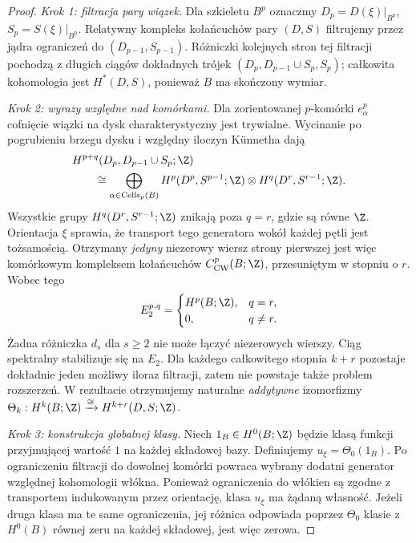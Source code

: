 \begin{proof}
\emph{Krok 1: filtracja pary wiązek.}
Dla szkieletu $B^p$ oznaczmy
$D_p=D(\xi)|_{B^p}$, $S_p=S(\xi)|_{B^p}$.
Relatywny kompleks kołańcuchów pary $(D,S)$
filtrujemy przez jądra ograniczeń do
$(D_{p-1},S_{p-1})$. Różniczki kolejnych stron
tej filtracji pochodzą z długich ciągów dokładnych
trójek $(D_p,D_{p-1}\cup S_p,S_p)$; całkowita
kohomologia jest $H^*(D,S)$, ponieważ $B$ ma
skończony wymiar.

\emph{Krok 2: wyrazy względne nad komórkami.}
Dla zorientowanej $p$-komórki $e^p_\alpha$ cofnięcie
wiązki na dysk charakterystyczny jest trywialne.
Wycinanie po pogrubieniu brzegu dysku i względny
iloczyn Künnetha dają
\[
\begin{aligned}
&H^{p+q}(D_p,D_{p-1}\cup S_p;\Z)\\
&\qquad\cong
\bigoplus_{\alpha\in\operatorname{Cells}_p(B)}
H^p(D^p,S^{p-1};\Z)\otimes
H^q(D^r,S^{r-1};\Z).
\end{aligned}
\]
Wszystkie grupy $H^q(D^r,S^{r-1};\Z)$ znikają
poza $q=r$, gdzie są równe $\Z$. Orientacja $\xi$
sprawia, że transport tego generatora wokół każdej
pętli jest tożsamością. Otrzymany \emph{jedyny}
niezerowy wiersz strony pierwszej jest więc
komórkowym kompleksem kołańcuchów
$C^p_{\mathrm{CW}}(B;\Z)$, przesuniętym w stopniu o $r$.
Wobec tego
\[
E_2^{p,q}=\begin{cases}H^p(B;\Z),&q=r,\\0,&q\ne r.
\end{cases}
\]
Żadna różniczka $d_s$ dla $s\ge2$ nie może łączyć
niezerowych wierszy. Ciąg spektralny stabilizuje się
na $E_2$. Dla każdego całkowitego stopnia $k+r$
pozostaje dokładnie jeden możliwy iloraz filtracji,
zatem nie powstaje także problem rozszerzeń.
W rezultacie otrzymujemy naturalne \emph{addytywne}
izomorfizmy
$\Theta_k:H^k(B;\Z)\xrightarrow{\cong}H^{k+r}(D,S;\Z)$.

\emph{Krok 3: konstrukcja globalnej klasy.}
Niech $1_B\in H^0(B;\Z)$ będzie klasą funkcji
przyjmującej wartość $1$ na każdej składowej bazy.
Definiujemy $u_\xi=\Theta_0(1_B)$.
Po ograniczeniu filtracji do dowolnej komórki
powraca wybrany dodatni generator względnej kohomologii
włókna. Ponieważ ograniczenia do włókien są zgodne
z transportem indukowanym przez orientację,
klasa $u_\xi$ ma żądaną własność. Jeżeli druga klasa
ma te same ograniczenia, jej różnica odpowiada
poprzez $\Theta_0$ klasie z $H^0(B)$ równej zeru
na każdej składowej, jest więc zerowa.


\end{proof}
